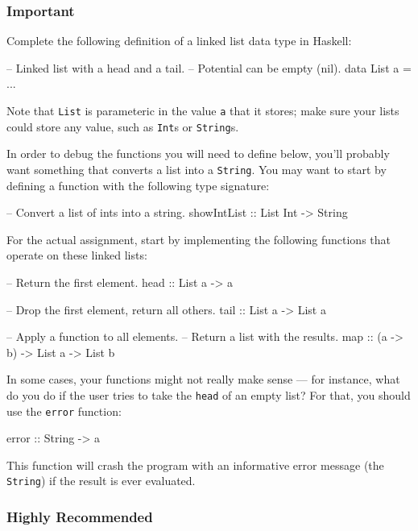 \documentclass{article}
\begin{document}
\subsubsection*{Important}
Complete the following definition of a linked list data type in Haskell:
\begin{haskellcode}
-- Linked list with a head and a tail.
-- Potential can be empty (nil).
data List a = ...
\end{haskellcode}
Note that \texttt{List} is parameteric in the value \texttt{a} that it stores; make sure your lists
could store any value, such as \texttt{Int}s or \texttt{String}s.

In order to debug the functions you will need to define below, you'll probably want something that
converts a list into a \texttt{String}. You may want to start by defining a function with the
following type signature:
\begin{haskellcode}
-- Convert a list of ints into a string.
showIntList :: List Int -> String
\end{haskellcode}

For the actual assignment, start by implementing the following functions that operate on these linked lists:
\begin{haskellcode}
-- Return the first element.
head :: List a -> a

-- Drop the first element, return all others.
tail :: List a -> List a

-- Apply a function to all elements.
-- Return a list with the results.
map :: (a -> b) -> List a -> List b
\end{haskellcode}

In some cases, your functions might not really make sense --- for instance, what do you do if the
user tries to take the \texttt{head} of an empty list? For that, you should use the \texttt{error}
function:
\begin{haskellcode}
error :: String -> a
\end{haskellcode}
This function will crash the program with an informative error message (the \texttt{String}) if the
result is ever evaluated.

\subsubsection*{Highly Recommended}
\end{document}
